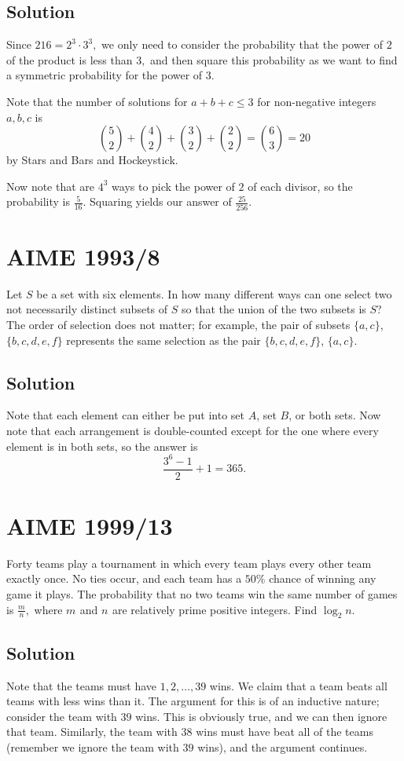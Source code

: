 \documentclass{article}
\begin{document}
\subsection{Solution}

Since $216=2^3\cdot 3^3,$ we only need to consider the probability that the power of $2$ of the product is less than $3,$ and then square this probability as we want to find a symmetric probability for the power of $3.$

Note that the number of solutions for $a+b+c\leq 3$ for non-negative integers $a,b,c$ is
\[\binom{5}{2}+\binom{4}{2}+\binom{3}{2}+\binom{2}{2}=\binom{6}{3}=20\]
by Stars and Bars and Hockeystick.

Now note that are $4^3$ ways to pick the power of $2$ of each divisor, so the probability is $\frac{5}{16}.$ Squaring yields our answer of $\frac{25}{256}.$

\pagebreak\section{AIME 1993/8}

Let $S$ be a set with six elements. In how many different ways can one select two not necessarily distinct subsets of $S$ so that the union of the two subsets is $S$? The order of selection does not matter; for example, the pair of subsets $\{a, c\}$, $\{b, c, d, e, f\}$ represents the same selection as the pair $\{b, c, d, e, f\}$, $\{a, c\}$.

\subsection{Solution}

Note that each element can either be put into set $A$, set $B$, or both sets. Now note that each arrangement is double-counted except for the one where every element is in both sets, so the answer is
\[\frac{3^6-1}{2}+1=365.\]

\pagebreak\section{AIME 1999/13}
Forty teams play a tournament in which every team plays every other team exactly once. No ties occur, and each team has a $50 \%$ chance of winning any game it plays. The probability that no two teams win the same number of games is $\frac mn,$ where $m_{}$ and $n_{}$ are relatively prime positive integers. Find $\log_2 n.$

\subsection{Solution}
Note that the teams must have $1,2,\ldots,39$ wins. We claim that a team beats all teams with less wins than it. The argument for this is of an inductive nature; consider the team with $39$ wins. This is obviously true, and we can then ignore that team. Similarly, the team with $38$ wins must have beat all of the teams (remember we ignore the team with $39$ wins), and the argument continues.
\end{document}
